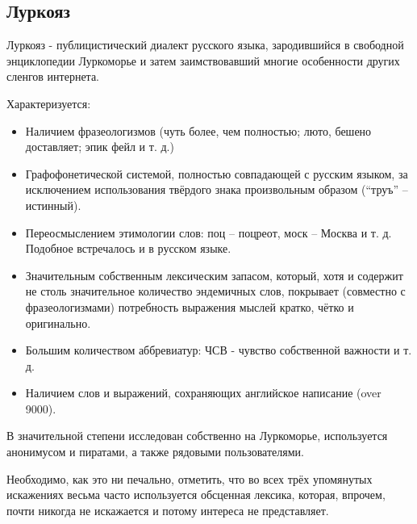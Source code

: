 \subsection{Луркояз}

Луркояз - публицистический диалект русского языка, зародившийся в свободной энциклопедии Луркоморье и затем заимствовавший многие особенности других сленгов интернета.

Характеризуется:

\begin{itemize}

\item Наличием фразеологизмов (чуть более, чем полностью; люто, бешено доставляет; эпик фейл и т. д.)

\item Графофонетической системой, полностью совпадающей с русским языком, за исключением использования твёрдого знака произвольным образом (``труъ'' -- истинный).

\item Переосмыслением этимологии слов: поц -- поцреот, моск -- Москва и т. д. Подобное встречалось и в русском языке.

\item Значительным собственным лексическим запасом, который, хотя и содержит не столь значительное количество эндемичных слов, покрывает (совместно с фразеологизмами) потребность выражения мыслей кратко, чётко и оригинально.

\item Большим количеством аббревиатур: ЧСВ - чувство собственной важности и т. д.

\item Наличием слов и выражений, сохраняющих английское написание (over 9000).

\end{itemize}

В значительной степени исследован собственно на Луркоморье, используется анонимусом и пиратами, а также рядовыми пользователями.

Необходимо, как это ни печально, отметить, что во всех трёх упомянутых искажениях весьма часто используется обсценная лексика, которая, впрочем, почти никогда не искажается и потому интереса не представляет.

